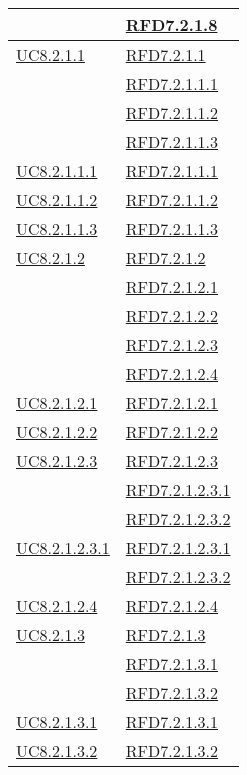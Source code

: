 \begin{longtable}{|>{\centering}m{5cm}|m{5cm}<{\centering}|}
& \hyperlink{RFD7.2.1.8}{RFD7.2.1.8}\\ \hline
\hyperref[UC8.2.1.1]{UC8.2.1.1} & \hyperlink{RFD7.2.1.1}{RFD7.2.1.1}\\
& \hyperlink{RFD7.2.1.1.1}{RFD7.2.1.1.1}\\
& \hyperlink{RFD7.2.1.1.2}{RFD7.2.1.1.2}\\
& \hyperlink{RFD7.2.1.1.3}{RFD7.2.1.1.3}\\ \hline
\hyperref[UC8.2.1.1.1]{UC8.2.1.1.1} & \hyperlink{RFD7.2.1.1.1}{RFD7.2.1.1.1}\\ \hline
\hyperref[UC8.2.1.1.2]{UC8.2.1.1.2} & \hyperlink{RFD7.2.1.1.2}{RFD7.2.1.1.2}\\ \hline
\hyperref[UC8.2.1.1.3]{UC8.2.1.1.3} & \hyperlink{RFD7.2.1.1.3}{RFD7.2.1.1.3}\\ \hline
\hyperref[UC8.2.1.2]{UC8.2.1.2} & \hyperlink{RFD7.2.1.2}{RFD7.2.1.2}\\
& \hyperlink{RFD7.2.1.2.1}{RFD7.2.1.2.1}\\
& \hyperlink{RFD7.2.1.2.2}{RFD7.2.1.2.2}\\
& \hyperlink{RFD7.2.1.2.3}{RFD7.2.1.2.3}\\
& \hyperlink{RFD7.2.1.2.4}{RFD7.2.1.2.4}\\ \hline
\hyperref[UC8.2.1.2.1]{UC8.2.1.2.1} & \hyperlink{RFD7.2.1.2.1}{RFD7.2.1.2.1}\\ \hline
\hyperref[UC8.2.1.2.2]{UC8.2.1.2.2} & \hyperlink{RFD7.2.1.2.2}{RFD7.2.1.2.2}\\ \hline
\hyperref[UC8.2.1.2.3]{UC8.2.1.2.3} & \hyperlink{RFD7.2.1.2.3}{RFD7.2.1.2.3}\\
& \hyperlink{RFD7.2.1.2.3.1}{RFD7.2.1.2.3.1}\\
& \hyperlink{RFD7.2.1.2.3.2}{RFD7.2.1.2.3.2}\\ \hline
\hyperref[UC8.2.1.2.3.1]{UC8.2.1.2.3.1} & \hyperlink{RFD7.2.1.2.3.1}{RFD7.2.1.2.3.1}\\
& \hyperlink{RFD7.2.1.2.3.2}{RFD7.2.1.2.3.2}\\ \hline
\hyperref[UC8.2.1.2.4]{UC8.2.1.2.4} & \hyperlink{RFD7.2.1.2.4}{RFD7.2.1.2.4}\\ \hline
\hyperref[UC8.2.1.3]{UC8.2.1.3} & \hyperlink{RFD7.2.1.3}{RFD7.2.1.3}\\
& \hyperlink{RFD7.2.1.3.1}{RFD7.2.1.3.1}\\
& \hyperlink{RFD7.2.1.3.2}{RFD7.2.1.3.2}\\ \hline
\hyperref[UC8.2.1.3.1]{UC8.2.1.3.1} & \hyperlink{RFD7.2.1.3.1}{RFD7.2.1.3.1}\\ \hline
\hyperref[UC8.2.1.3.2]{UC8.2.1.3.2} & \hyperlink{RFD7.2.1.3.2}{RFD7.2.1.3.2}\\ \hline

\end{longtable}
